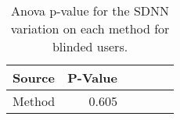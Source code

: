
\begin{table}[!htb]
\centering
\caption{Anova p-value for the SDNN variation on each method for blinded users.}
\label{tab:blocanova_sdnn_var_blind}
\begin{tabular}{lrrrrr}
\toprule
Source & P-Value \\
\midrule
Method &   0.605 \\
\bottomrule
\end{tabular}
\end{table}

